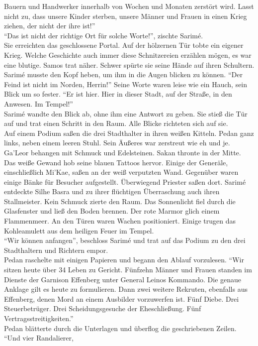 Bauern und Handwerker innerhalb von Wochen und Monaten zerstört wird. Lasst nicht zu, dass unsere 
Kinder sterben, unsere Männer und Frauen in einen Krieg ziehen, der nicht der ihre ist!''\\
``Das ist nicht der richtige Ort für solche Worte!'', zischte Sarimé.\\
Sie erreichten das geschlossene Portal. Auf der hölzernen Tür tobte ein eigener Krieg. Welche 
Geschichte auch immer diese Schnitzereien erzählen mögen, es war eine blutige. Samos trat näher. 
Schwer spürte sie seine Hände auf ihren Schultern. Sarimé musste den Kopf heben, um ihm in die 
Augen blicken zu können. ``Der Feind ist nicht im Norden, Herrin!'' Seine Worte waren leise wie ein 
Hauch, sein Blick um so fester. ``Er ist hier. Hier in dieser Stadt, auf der Straße, in den 
Anwesen. Im Tempel!''\\
Sarimé wandte den Blick ab, ohne ihm eine Antwort zu geben. Sie stieß die Tür auf und trat einen 
Schritt in den Raum. Alle Blicke richteten sich auf sie.\\
Auf einem Podium saßen die drei Stadthalter in ihren weißen Kitteln. Pedan ganz links, neben einem 
leeren Stuhl. Sein Äußeres war zerstreut wie eh und je. Ga'Leor behangen mit Schmuck und 
Edelsteinen. Sakan thronte in der Mitte. Das weiße Gewand hob seine blauen Tattoos hervor. Einige 
der Generäle, einschließlich Mi'Kae, saßen an der weiß verputzten Wand. Gegenüber waren einige Bänke 
für Besucher aufgestellt. Überwiegend Priester saßen dort. Sarimé entdeckte Silhe Basra und zu 
ihrer flüchtigen Überraschung auch ihren Stallmeister. Kein Schmuck zierte den Raum. Das 
Sonnenlicht fiel durch die Glasfenster und ließ den Boden brennen. Der rote Marmor glich einem 
Flammenmeer. An den Türen waren Wachen positioniert. Einige trugen das Kohleamulett aus dem heiligen 
Feuer im Tempel.\\
``Wir können anfangen'', beschloss Sarimé und trat auf das Podium zu den drei Stadthaltern und 
Richtern empor.\\
Pedan raschelte mit einigen Papieren und begann den Ablauf vorzulesen. ``Wir sitzen heute über 34 
Leben zu Gericht. Fünfzehn Männer und Frauen standen im Dienste der Garnison Effenberg unter 
General Leinos Kommando. Die genaue Anklage gilt es heute zu formulieren. Dann zwei weitere 
Rekruten, ebenfalls aus Effenberg, denen Mord an einem Ausbilder vorzuwerfen ist. Fünf Diebe. Drei 
Steuerbetrüger. Drei Scheidungsgesuche der Eheschließung. Fünf Vertragsstreitigkeiten.''\\
Pedan blätterte durch die Unterlagen und überflog die geschriebenen Zeilen. ``Und vier Randalierer, 

